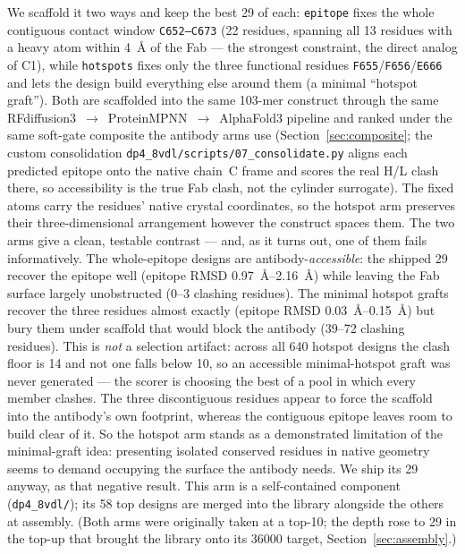 We scaffold it two ways and keep the best \num{29} of each: \texttt{epitope} fixes the whole
contiguous contact window \texttt{C652--C673} (\num{22} residues, spanning all \num{13} residues with a
heavy atom within \SI{4}{\angstrom} of the Fab --- the strongest constraint, the direct analog of C1),
while \texttt{hotspots} fixes only the three functional residues \texttt{F655}/\texttt{F656}/\texttt{E666}
and lets the design build everything else around them (a minimal ``hotspot graft''). Both are scaffolded
into the same \num{103}-mer construct through the same
RFdiffusion3~$\rightarrow$~ProteinMPNN~$\rightarrow$~AlphaFold3 pipeline and ranked under the same
soft-gate composite the antibody arms use (Section~\ref{sec:composite}; the custom consolidation
\texttt{dp4\_8vdl/scripts/07\_consolidate.py} aligns each predicted epitope onto the native chain~C
frame and scores the real H/L clash there, so accessibility is the true Fab clash, not the cylinder
surrogate). The fixed atoms carry the residues' native crystal coordinates, so the hotspot arm preserves
their three-dimensional arrangement however the construct spaces them. The two arms give a clean,
testable contrast --- and, as it turns out, one of them fails informatively. The whole-epitope designs
are antibody-\emph{accessible}: the shipped \num{29} recover the epitope well (epitope RMSD
\SIrange{0.97}{2.16}{\angstrom}) while leaving the Fab surface largely unobstructed (\numrange{0}{3}
clashing residues). The minimal hotspot grafts recover the three residues almost exactly (epitope RMSD
\SIrange{0.03}{0.15}{\angstrom}) but bury them under scaffold that would block the antibody
(\numrange{39}{72} clashing residues). This is \emph{not} a selection artifact: across all
\num{640} hotspot designs the clash floor is \num{14} and not one falls below \num{10}, so an accessible
minimal-hotspot graft was never generated --- the scorer is choosing the best of a pool in which every
member clashes. The three discontiguous residues appear to force the scaffold into the antibody's own
footprint, whereas the contiguous epitope leaves room to build clear of it. So the hotspot arm stands as
a demonstrated limitation of the minimal-graft idea: presenting isolated conserved residues in native
geometry seems to demand occupying the surface the antibody needs. We ship its \num{29} anyway, as
that negative result. This arm is a self-contained component (\texttt{dp4\_8vdl/}); its \num{58} top
designs are merged into the library alongside the others at assembly. (Both arms were originally taken at
a top-\num{10}; the depth rose to \num{29} in the top-up that brought the library onto its \num{36000}
target, Section~\ref{sec:assembly}.)

